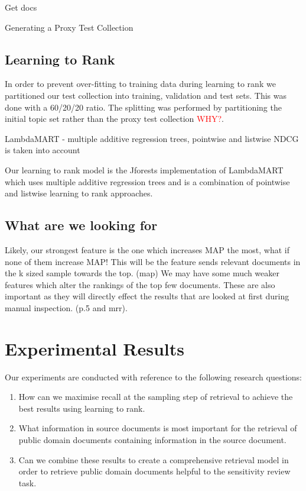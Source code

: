 \documentclass{mpaper}
\let\oldcite=\cite
\renewcommand\cite[1]{\ifthenelse{\equal{#1}{NEEDED}}{\ensuremath{^\texttt{[citation~needed]}}}{\oldcite{#1}}}
\newcommand{\remove}[1]{\textcolor{red}{#1}}
\begin{document}
\begin{algorithm}
\SetAlgoLined
{}
 Get docs\;
 \caption{Generating a Proxy Test Collection}
\end{algorithm}

\subsection{Learning to Rank}
In order to prevent over-fitting to training data during learning to rank we partitioned our test collection into training, validation and test sets.
This was done with a 60/20/20 ratio.
The splitting was performed by partitioning the initial topic set rather than the proxy test collection \remove{WHY?}.

LambdaMART - multiple additive regression trees, pointwise and listwise
NDCG is taken into account

Our learning to rank model is the Jforests implementation of LambdaMART  which uses multiple additive regression trees and is a combination of pointwise and listwise learning to rank approaches.~\cite{NEEDED}

\subsection{What are we looking for}
Likely, our strongest feature is the one which increases MAP the most, what if none of them increase MAP! This will be the feature sends relevant documents in the k sized sample towards the top. (map)
We may have some much weaker features which alter the rankings of the top few documents. These are also important as they will directly effect the results that are looked at first during manual inspection. (p.5 and mrr).


\section{Experimental Results} \label{sec:results}
Our experiments are conducted with reference to the following research questions:
\begin{enumerate}[label=\textbf{RQ.\arabic*}]
\item How can we maximise recall at the sampling step of retrieval to achieve the best results using learning to rank.
\item What information in source documents is most important for the retrieval of public domain documents containing information in the source document.
\item Can we combine these results to create a comprehensive retrieval model in order to retrieve public domain documents helpful to the sensitivity review task.
\end{enumerate}
\end{document}
